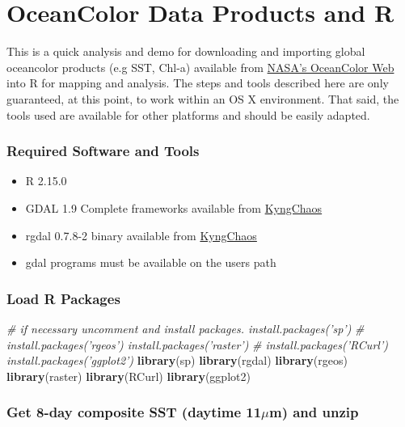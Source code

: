 \documentclass[]{article}
\newenvironment{Shaded}{}{}
\newcommand{\KeywordTok}[1]{\textcolor[rgb]{0.00,0.44,0.13}{\textbf{{#1}}}}
\newcommand{\CommentTok}[1]{\textcolor[rgb]{0.38,0.63,0.69}{\textit{{#1}}}}
\newcommand{\NormalTok}[1]{{#1}}
\begin{document}
\section{OceanColor Data Products and R}

This is a quick analysis and demo for downloading and importing global
oceancolor products (e.g SST, Chl-a) available from
\href{http://oceancolor.gsfc.nass.gov}{NASA's OceanColor Web} into R for
mapping and analysis. The steps and tools described here are only
guaranteed, at this point, to work within an OS X environment. That
said, the tools used are available for other platforms and should be
easily adapted.

\subsubsection{Required Software and Tools}

\begin{itemize}
\item
  R 2.15.0
\item
  GDAL 1.9 Complete frameworks available from
  \href{http://www.kyngchaos.com/software/frameworks}{KyngChaos}
\item
  rgdal 0.7.8-2 binary available from
  \href{http://www.kyngchaos.com/software/frameworks}{KyngChaos}
\item
  gdal programs must be available on the users path
\end{itemize}

\subsubsection{Load R Packages}

\begin{Shaded}
\begin{Highlighting}[]
\CommentTok{# if necessary uncomment and install packages.  install.packages('sp')}
\CommentTok{# install.packages('rgeos') install.packages('raster')}
\CommentTok{# install.packages('RCurl') install.packages('ggplot2')}
\KeywordTok{library}\NormalTok{(sp)}
\KeywordTok{library}\NormalTok{(rgdal)}
\KeywordTok{library}\NormalTok{(rgeos)}
\KeywordTok{library}\NormalTok{(raster)}
\KeywordTok{library}\NormalTok{(RCurl)}
\KeywordTok{library}\NormalTok{(ggplot2)}
\end{Highlighting}
\end{Shaded}
\subsubsection{Get 8-day composite SST (daytime 11$\mu$m) and unzip}
\end{document}
